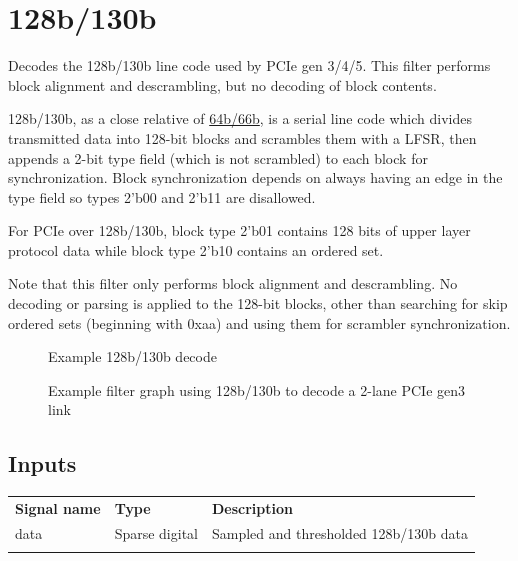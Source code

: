 \pagebreak
\section{128b/130b}
\label{filter:128b130b}

Decodes the 128b/130b line code used by PCIe gen 3/4/5. This filter performs block alignment and descrambling, but no
decoding of block contents.

128b/130b, as a close relative of \hyperref[filter:128b130b]{64b/66b}, is a serial line code which divides transmitted
data into 128-bit blocks and scrambles them with a LFSR, then appends a 2-bit type field (which is not scrambled) to
each block for synchronization. Block synchronization depends on always having an edge in the type field so types 2'b00
and 2'b11 are disallowed.

For PCIe over 128b/130b, block type 2'b01 contains 128 bits of upper layer protocol data while block type 2'b10
contains an ordered set.

Note that this filter only performs block alignment and descrambling. No decoding or parsing is applied to the 128-bit
blocks, other than searching for skip ordered sets (beginning with 0xaa) and using them for scrambler synchronization.

\begin{figure}[h]
\centering
{}
\caption{Example 128b/130b decode}
\label{filter_128b130b}
\end{figure}

\begin{figure}[h]
\centering
{}
\caption{Example filter graph using 128b/130b to decode a 2-lane PCIe gen3 link}
\label{filter_graph_128b130b}
\end{figure}

\subsection{Inputs}

\begin{tabularx}{16cm}{llX}
\thickhline
\textbf{Signal name} & \textbf{Type} & \textbf{Description} \\
\thickhline
data & Sparse digital & Sampled and thresholded 128b/130b data \\
\thickhline
\end{tabularx}

